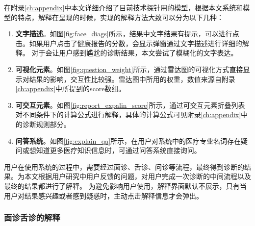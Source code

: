 在附录\ref{ch:appendix}中本文详细介绍了目前技术探针用的模型，根据本文系统和模型的特点，解释在呈现的时候，实现的解释方法大致可以分为以下几种：
\begin{enumerate}
    \item \textbf{文字描述}。如图\ref{fig:face_diags}所示，结果中文字结果有提示，可以进行点击。如果用户点击了健康报告的分数，会显示弹窗通过文字描述进行详细的解释。
    对于会让用户感到尴尬的诊断结果，本文尝试了模糊化的文字表达。

    \item \textbf{可视化元素}。如图\ref{fig:question_weight}所示，通过雷达图的可视化方式直接显示对结果的影响，交互性比较强。雷达图中所用的权重，数值来源自附录\ref{ch:appendix}中所提到的score数组。
    
    \item \textbf{可交互元素}。如图\ref{fig:report_expalin_score}所示，通过可交互元素折叠列表对不同条件下的计算公式进行解释，具体的计算公式可见附录\ref{ch:appendix}中的诊断规则部分。

    \item \textbf{问答系统}。如图\ref{fig:explain_qa}所示，在用户对系统中的医疗专业名词存在疑问或想知道更多医疗知识信息时，可通过问答系统直接询问。
\end{enumerate}

用户在使用系统的过程中，需要经过面诊、舌诊、问诊等流程，最终得到诊断的结果。为本文根据用户研究中用户反馈的问题，对用户完成一次诊断的中间流程以及最终的结果都进行了解释。
为避免影响用户使用，解释界面默认不展示，只有当用户对结果感兴趣或者感到疑惑时，主动点击解释信息才会弹出。

\subsubsection{面诊舌诊的解释}

